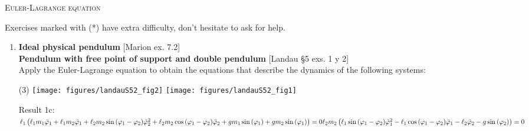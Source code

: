 \documentclass[11pt, a4paper, twoside]{article}
\begin{document}
\begin{center}
  \textsc{\large Euler-Lagrange equation}
\end{center}

\noindent
Exercises marked with (*) have extra difficulty, don't hesitate to ask for help.

\begin{enumerate} 

\item
\textbf{Ideal physical pendulum} [Marion ex. 7.2] \\ 
\textbf{Pendulum with free point of support and double pendulum} [Landau \S5 exs. 1 y 2]\\
Apply the Euler-Lagrange equation to obtain the equations that describe the dynamics of the following systems:
\begin{tasks}(3)
	\task 
	\task \texttt{[image: figures/landauS52\_fig2]}
	\task \texttt{[image: figures/landauS52\_fig1]}
\end{tasks}
Result 1c:\\
\(
\ell_{1} \left(\ell_{1} m_{1} \ddot{\varphi}_{1} + \ell_{1} m_{2} \ddot{\varphi}_{1} + \ell_{2} m_{2} \sin{\left(\varphi_{1} - \varphi_{2} \right)} \dot{\varphi}_{2}^{2} + \ell_{2} m_{2} \cos{\left(\varphi_{1} - \varphi_{2} \right)} \ddot{\varphi}_{2} + g m_{1} \sin{\left(\varphi_{1} \right)} + g m_{2} \sin{\left(\varphi_{1} \right)}\right) = 0\\
\ell_{2} m_{2} \left(\ell_{1} \sin{\left(\varphi_{1} - \varphi_{2} \right)} \dot{\varphi}_{1}^{2} - \ell_{1} \cos{\left(\varphi_{1} - \varphi_{2} \right)} \ddot{\varphi}_{1} - \ell_{2} \ddot{\varphi}_{2} - g \sin{\left(\varphi_{2} \right)}\right) = 0
\)



\end{enumerate}
\end{document}

